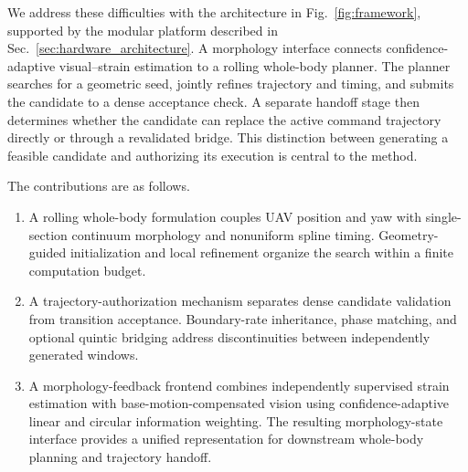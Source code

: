 \documentclass[journal,twoside]{IEEEtran}
\begin{document}
We address these difficulties with the architecture in Fig.~\ref{fig:framework}, supported by the modular platform described in Sec.~\ref{sec:hardware_architecture}. A morphology interface connects confidence-adaptive visual--strain estimation to a rolling whole-body planner. The planner searches for a geometric seed, jointly refines trajectory and timing, and submits the candidate to a dense acceptance check. A separate handoff stage then determines whether the candidate can replace the active command trajectory directly or through a revalidated bridge. This distinction between generating a feasible candidate and authorizing its execution is central to the method.

The contributions are as follows.
\begin{enumerate}
\item A rolling whole-body formulation couples UAV position and yaw with single-section continuum morphology and nonuniform spline timing. Geometry-guided initialization and local refinement organize the search within a finite computation budget.
\item A trajectory-authorization mechanism separates dense candidate validation from transition acceptance. Boundary-rate inheritance, phase matching, and optional quintic bridging address discontinuities between independently generated windows.
\item A morphology-feedback frontend combines independently supervised strain estimation with base-motion-compensated vision using confidence-adaptive linear and circular information weighting. The resulting morphology-state interface provides a unified representation for downstream whole-body planning and trajectory handoff.
\end{enumerate}
\end{document}
